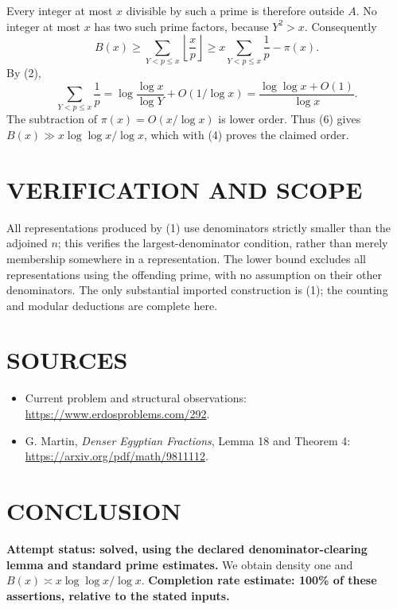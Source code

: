 Every integer at most $x$ divisible by such a prime is therefore outside $A$. No integer at most $x$ has two such prime factors, because $Y^2>x$. Consequently
\[
B(x)\geq\sum_{Y<p\leq x}\left\lfloor\frac xp\right\rfloor
\geq x\sum_{Y<p\leq x}\frac1p-\pi(x).
\tag{6}
\]
By (2),
\[
\sum_{Y<p\leq x}\frac1p
=\log\frac{\log x}{\log Y}+O(1/\log x)
=\frac{\log\log x+O(1)}{\log x}.
\]
The subtraction of $\pi(x)=O(x/\log x)$ is lower order. Thus (6) gives $B(x)\gg x\log\log x/\log x$, which with (4) proves the claimed order.

\section{VERIFICATION AND SCOPE}
All representations produced by (1) use denominators strictly smaller than the adjoined $n$; this verifies the largest-denominator condition, rather than merely membership somewhere in a representation. The lower bound excludes all representations using the offending prime, with no assumption on their other denominators. The only substantial imported construction is (1); the counting and modular deductions are complete here.

\section{SOURCES}
\begin{itemize}
\item Current problem and structural observations: \url{https://www.erdosproblems.com/292}.
\item G. Martin, \emph{Denser Egyptian Fractions}, Lemma 18 and Theorem 4: \url{https://arxiv.org/pdf/math/9811112}.
\end{itemize}
\section{CONCLUSION}
\textbf{Attempt status: solved, using the declared denominator-clearing lemma and standard prime estimates.}
We obtain density one and $B(x)\asymp x\log\log x/\log x$.
\textbf{Completion rate estimate: 100\% of these assertions, relative to the stated inputs.}
